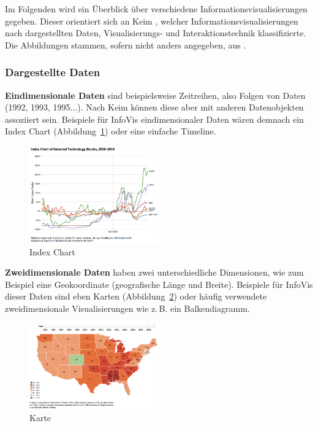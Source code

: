\documentclass[
	headsepline,
	footsepline,
	fontsize=12pt,
	bibliography=totoc
]{scrbook}
\begin{document}
Im Folgenden wird ein Überblick über verschiedene Informationsvisualisierungen gegeben. Dieser orientiert sich an Keim \cite{Keim2002}, welcher Informationsvisualisierungen nach dargestellten Daten, Visualisierungs- und Interaktionstechnik klassifizierte. Die Abbildungen stammen, sofern nicht anders angegeben, aus \cite{Heer2010}.

\subsubsection{Dargestellte Daten}
\label{section:dargestellte_daten}

\textbf{Eindimensionale Daten} sind beispielsweise Zeitreihen, also Folgen von Daten (1992, 1993, 1995...). Nach Keim können diese aber mit anderen Datenobjekten assoziiert sein. Beispiele für InfoVis eindimensionaler Daten wären demnach ein Index Chart (Abbildung~\ref{figure:index_chart}) oder eine einfache Timeline.

\begin{figure}[htbp]
   \centering
   \includegraphics[width=0.5\textwidth]{images/grundlagen-index_chart.png}
   \caption{Index Chart}
   \label{figure:index_chart}
\end{figure}

\textbf{Zweidimensionale Daten} haben zwei unterschiedliche Dimensionen, wie zum Beispiel eine Geokoordinate (geografische Länge und Breite). Beispiele für InfoVis dieser Daten sind eben Karten (Abbildung~\ref{figure:karte}) oder häufig verwendete zweidimensionale Visualisierungen wie z.\,B. ein Balkendiagramm.

\begin{figure}[htbp]
   \centering
   \includegraphics[width=0.5\textwidth]{images/grundlagen-karte.png}
   \caption{Karte}
   \label{figure:karte}
\end{figure}
\end{document}
